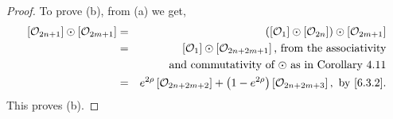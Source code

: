 \documentclass[10pt,a4paper]{amsart}
\def\ref#1{#1}
\begin{document}
\begin{proof}
To prove (b), from (a) we get,
\begin{eqnarray*}
\left[ \mathcal{O}_{2n+1}\right] \odot \left[ \mathcal{O}_{2m+1}\right]  &=& \left(\left[ \mathcal{O}_{1}\right] \odot \left[ \mathcal{O}_{2n}\right] \right)\odot  \left[ \mathcal{O}_{2m+1}\right] \\
&=& \left[ \mathcal{O}_{1}\right] \odot \left[ \mathcal{O}_{2n+2m+1}\right] \mbox{, from the associativity}\\
&&\mbox{ and commutativity of $\odot$ as in  Corollary \ref{4.11}}\\
&=&e^{2\rho}\left[ \mathcal{O}_{2n+2m+2}\right] +\left(1-e^{2\rho}\right)\left[ \mathcal{O}_{2n+2m+3}\right], \mbox{  by \eqref{6.3.2}.}
\end{eqnarray*}
This proves (b).
\end{proof}
\end{document}
